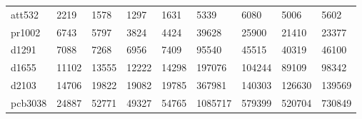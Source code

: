 \documentclass[english, 12pt, a4paper, sci, utf8, a-1b, online]{aaltothesis}
\begin{document}
\begin{table}[H]
\begin{adjustbox}{center}
\begin{tabular}{@{}lllllllll@{}}
att532   & 2219                                               & 1578                                                 & 1297                                                 & 1631                                                 & 5339                                               & 6080                                                 & 5006                                                 & 5602                                                 \\
pr1002   & 6743                                               & 5797                                                 & 3824                                                 & 4424                                                 & 39628                                              & 25900                                                & 21410                                                & 23377                                                \\
d1291    & 7088                                               & 7268                                                 & 6956                                                 & 7409                                                 & 95540                                              & 45515                                                & 40319                                                & 46100                                                \\
d1655    & 11102                                              & 13555                                                & 12222                                                & 14298                                                & 197076                                             & 104244                                               & 89109                                                & 98342                                                \\
d2103    & 14706                                              & 19822                                                & 19082                                                & 19785                                                & 367981                                            & 140303                                               & 126630                                               & 139569                                               \\
pcb3038  & 24887                                              & 52771                                                & 49327                                                & 54765                                                & 1085717                                                    & 579399                                                      & 520704                                                      & 730849                                                     \\

\end{tabular}
\end{adjustbox}
\end{table}
\end{document}

